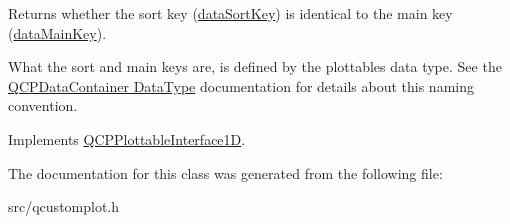 Returns whether the sort key (\hyperlink{classQCPAbstractPlottable1D_aa8277da921b009bce474437d50b4a2d8}{data\+Sort\+Key}) is identical to the main key (\hyperlink{classQCPAbstractPlottable1D_aeb156ebf5d3c8de906b428be30733ad8}{data\+Main\+Key}).

What the sort and main keys are, is defined by the plottable\textquotesingle{}s data type. See the \hyperlink{classQCPDataContainer_qcpdatacontainer-datatype}{Q\+C\+P\+Data\+Container Data\+Type} documentation for details about this naming convention. 

Implements \hyperlink{classQCPPlottableInterface1D_a229e65e7ab968dd6cd0e259fa504b79d}{Q\+C\+P\+Plottable\+Interface1D}.



The documentation for this class was generated from the following file\+:\begin{DoxyCompactItemize}
\item 
src/qcustomplot.\+h\end{DoxyCompactItemize}
